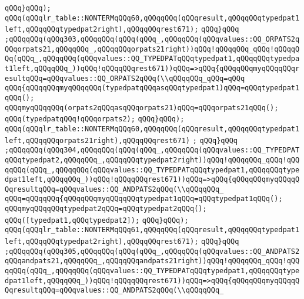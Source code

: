 \verb|qQQq}qQQq);|\newline
\verb|qQQq(qQQqlr_table::NONTERMqQQq60,qQQqqQQq(qQQqresult,qQQqqQQqtypedpat1left,qQQqqQQqtypedpat2right),qQQqqQQqrest671);|\newline
\verb|qQQq}qQQq|\newline
\verb|;qQQqqQQq(qQQq303,qQQqqQQq(qQQq(qQQq_,qQQqqQQq(qQQqvalues::QQ_ORPATS2qQQqorpats21,qQQqqQQq_,qQQqqQQqorpats21right))qQQq!qQQqqQQq_qQQq!qQQqqQQq(qQQq_,qQQqqQQq(qQQqvalues::QQ_TYPEDPATqQQqtypedpat1,qQQqqQQqtypedpat1left,qQQqqQQq_))qQQq!qQQqqQQqrest671))qQQq=>qQQq{qQQqqQQqmyqQQqqQQqresultqQQq=qQQqvalues::QQ_ORPATS2qQQq(\\qQQqqQQq_qQQq=qQQq|\newline
\verb|qQQq{qQQqqQQqmyqQQqqQQq(typedpatqQQqasqQQqtypedpat1)qQQq=qQQqtypedpat1qQQq();|\newline
\verb|qQQqmyqQQqqQQq(orpats2qQQqasqQQqorpats21)qQQq=qQQqorpats21qQQq();|\newline
\verb|qQQq(typedpatqQQq!qQQqorpats2);|\newline
\verb|qQQq}qQQq);|\newline
\verb|qQQq(qQQqlr_table::NONTERMqQQq60,qQQqqQQq(qQQqresult,qQQqqQQqtypedpat1left,qQQqqQQqorpats21right),qQQqqQQqrest671)|\newline
\verb|;|\newline
\verb|qQQq}qQQq|\newline
\verb|;qQQqqQQq(qQQq304,qQQqqQQq(qQQq(qQQq_,qQQqqQQq(qQQqvalues::QQ_TYPEDPATqQQqtypedpat2,qQQqqQQq_,qQQqqQQqtypedpat2right))qQQq!qQQqqQQq_qQQq!qQQqqQQq(qQQq_,qQQqqQQq(qQQqvalues::QQ_TYPEDPATqQQqtypedpat1,qQQqqQQqtypedpat1left,qQQqqQQq_))qQQq!qQQqqQQqrest671))qQQq=>qQQq{qQQqqQQqmyqQQqqQQqresultqQQq=qQQqvalues::QQ_ANDPATS2qQQq(\\qQQqqQQq_|\newline
\verb|qQQq=qQQqqQQq{qQQqqQQqmyqQQqqQQqtypedpat1qQQq=qQQqtypedpat1qQQq();|\newline
\verb|qQQqmyqQQqqQQqtypedpat2qQQq=qQQqtypedpat2qQQq();|\newline
\verb|qQQq([typedpat1,qQQqtypedpat2]);|\newline
\verb|qQQq}qQQq);|\newline
\verb|qQQq(qQQqlr_table::NONTERMqQQq61,qQQqqQQq(qQQqresult,qQQqqQQqtypedpat1left,qQQqqQQqtypedpat2right),qQQqqQQqrest671);|\newline
\verb|qQQq}qQQq|\newline
\verb|;qQQqqQQq(qQQq305,qQQqqQQq(qQQq(qQQq_,qQQqqQQq(qQQqvalues::QQ_ANDPATS2qQQqandpats21,qQQqqQQq_,qQQqqQQqandpats21right))qQQq!qQQqqQQq_qQQq!qQQqqQQq(qQQq_,qQQqqQQq(qQQqvalues::QQ_TYPEDPATqQQqtypedpat1,qQQqqQQqtypedpat1left,qQQqqQQq_))qQQq!qQQqqQQqrest671))qQQq=>qQQq{qQQqqQQqmyqQQqqQQqresultqQQq=qQQqvalues::QQ_ANDPATS2qQQq(\\qQQqqQQq_|\newline
